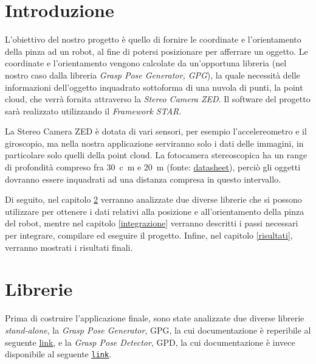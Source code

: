 \documentclass{report}
\begin{document}
\chapter{Introduzione}
L'obiettivo del nostro progetto è quello di fornire le coordinate e l'orientamento della pinza ad un robot, al fine di potersi posizionare per afferrare un oggetto. Le coordinate e l'orientamento vengono calcolate da un'opportuna libreria (nel nostro caso dalla libreria \textit{Grasp Pose Generator, GPG}), la quale necessità delle informazioni dell'oggetto inquadrato sottoforma di una nuvola di punti, la point cloud, che verrà fornita attraverso la \textit{Stereo Camera ZED}. Il software del progetto sarà realizzato utilizzando il \textit{Framework STAR}. \par
La Stereo Camera ZED è dotata di vari sensori, per esempio l'accelereometro e il giroscopio, ma nella nostra applicazione serviranno solo i dati delle immagini, in particolare solo quelli della point cloud. La fotocamera stereoscopica ha un range di profondità compreso fra \SI{30}{c\meter} e \SI{20}{\meter} (fonte: \textcolor{blue}{\underline{\href{https://www.stereolabs.com/assets/datasheets/zed2-camera-datasheet.pdf}{datasheet}}}), perciò gli oggetti dovranno essere inquadrati ad una distanza compresa in questo intervallo. \par
Di seguito, nel capitolo \ref{librerie} verranno analizzate due diverse librerie che si possono utilizzare per ottenere i dati relativi alla posizione e all'orientamento della pinza del robot, mentre nel capitolo \ref{integrazione} verranno descritti i passi necessari per integrare, compilare ed eseguire il progetto. Infine, nel capitolo \ref{risultati}, verranno mostrati i risultati finali.
\newpage
\chapter{Librerie}\label{librerie}
Prima di costruire l'applicazione finale, sono state analizzate due diverse librerie \textit{stand-alone}, la \textit{Grasp Pose Generator}, GPG, la cui documentazione è reperibile al seguente \textcolor{blue}{\underline{\href{https://github.com/atenpas/gpg}{link}}}, e la \textit{Grasp Pose Detector}, GPD, la cui documentazione è invece disponibile al seguente \texttt{\textcolor{blue}{\underline{\href{https://github.com/atenpas/gpd}{link}}}}.\par
{}
\end{document}
